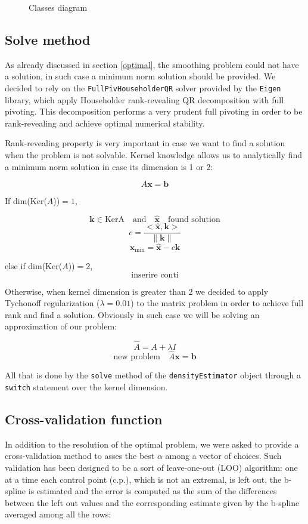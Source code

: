 \begin{itemize}
\begin{figure}[ht]
	\caption{Classes diagram}
	\label{fig:diagram}
	
\end{figure}

\end{itemize}

\subsection{Solve method} \label{solvemethod}
As already discussed in section \ref{optimal}, the smoothing problem could not have a solution, in such case a minimum norm solution should be provided.
We decided to rely on the \verb|FullPivHouseholderQR| solver provided by the \verb|Eigen| library, which apply Householder rank-revealing QR decomposition with full pivoting. This decomposition performs a very prudent full pivoting in order to be rank-revealing and achieve optimal numerical stability. 

Rank-revealing property is very important in case we want to find a solution when the problem is not solvable. Kernel knowledge allows us to analytically find a minimum norm solution in case its dimension is 1 or 2:

\[ A\bm{x}=\bm{b} \]

If dim(Ker($A$))$=1$,
	
\[ \bm{k}\in\text{Ker{A}} \quad \text{and} \quad \bm{\hat{x}} \quad \text{found solution} \]
\[ c=\frac{<\bm{\hat{x}},\bm{k}>}{\| \bm{k} \|} \]
\[ \bm{x}_{\text{min}} = \bm{\hat{x}} - c\bm{k} \]

else if dim(Ker($A$))$=2$,
\[  \text{inserire conti} \]

Otherwise, when kernel dimension is greater than 2 we decided to apply Tychonoff regularization ($\lambda=0.01$) to the matrix problem in order to achieve full rank and find a solution. Obviously in such case we will be solving an approximation of our problem:

\[  \hat{A}=A + \lambda I \]
\[  \text{new problem} \quad \hat{A}\bm{x}=\bm{b} \]

All that is done by the \verb|solve| method of the \verb|densityEstimator| object through a \verb|switch| statement over the kernel dimension.

\subsection{Cross-validation function} \label{cv}
In addition to the resolution of the optimal problem, we were asked to provide a cross-validation method to asses the best $\alpha$ among a vector of choices. Such validation has been designed to be a sort of leave-one-out (LOO) algorithm: one at a time each control point (c.p.), which is not an extremal, is left out, the b-spline is estimated and the error is computed as the sum of the differences between the left out values and the corresponding estimate given by the b-spline averaged among all the rows:

